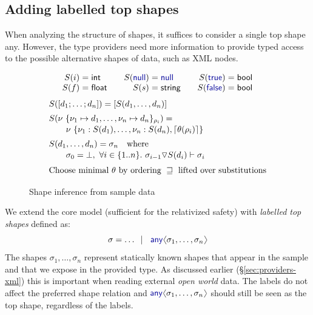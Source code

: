 \documentclass[10pt,preprint,clearpagebib]{sigplanconf}
\newcommand{\langl}{\begin{picture}(4.5,7)
\put(1.1,2.5){\rotatebox{60}{\line(1,0){5.5}}}
\put(1.1,2.5){\rotatebox{300}{\line(1,0){5.5}}}
\end{picture}}
\newcommand{\rangl}{\begin{picture}(4.5,7)
\put(.9,2.5){\rotatebox{120}{\line(1,0){5.5}}}
\put(.9,2.5){\rotatebox{240}{\line(1,0){5.5}}}
\end{picture}}
\newcommand{\kvd}[1]{\textnormal{\textcolor{kvdclr}{\sffamily #1}}}
\newcommand{\ident}[1]{\textnormal{\sffamily #1}}
\newcommand{\lsep}[0]{\;\; | \;\;}
\newcommand{\narrow}[1]{\hspace{-0.7em} #1 \hspace{-0.7em}}
\newcommand{\addopt}[1]{\lceil#1\rceil}
\newcommand{\semalt}[1]{S(#1)}
\begin{document}
\subsection{Adding labelled top shapes}
\label{sec:inference-vars}

When analyzing the structure of shapes, it suffices to consider a single top shape \kvd{any}.
However, the type providers need more information to provide typed access to the possible 
alternative shapes of data, such as XML nodes. 

\begin{figure}[!h]
\noindent
\begin{equation*}
\begin{array}{rclcrclcrcl}
 \semalt{i} &\narrow{=}& \ident{int} && \semalt{\kvd{null}}  &\narrow{=}& \kvd{null} && \semalt{\kvd{true}} &\narrow{=}& \ident{bool}\\
 \semalt{f} &\narrow{=}& \ident{float} && \semalt{s} &\narrow{=}& \ident{string} && \semalt{\kvd{false}}  &\narrow{=}& \ident{bool}\\
\end{array}
\end{equation*}
\noindent
\vspace{-0.5em}
\begin{equation*}
\begin{array}{l}
 \semalt{[d_1; \ldots; d_n]} = [\semalt{d_1, \ldots, d_n}]
 \\[0.5em]
 \semalt{\nu~\{ \nu_1 \mapsto d_1, \ldots, \nu_n \mapsto d_n \}_{\rho_i}} =\\[0.1em]
 \qquad\nu~\{ \nu_1:\semalt{d_1}, \ldots, \nu_n :\semalt{d_n}, \addopt{\theta(\rho_i)} \}
 \\[0.5em]
 \semalt{d_1, \ldots, d_n} = \sigma_n \quad\textnormal{where}\\[0.1em]
 \qquad\sigma_0 = \bot,~ \forall i\in \{ 1.. n \}.~ \sigma_{i-1} \triangledown \semalt{d_i} \vdash \sigma_i \\[0.6em]
 \textnormal{Choose minimal}\ \theta\ \textnormal{by ordering}\ \sqsupseteq\ \textnormal{lifted over substitutions} \\[0.1em]
\end{array}
\end{equation*}
\caption{Shape inference from sample data}
\label{fig:shape-inference}
\vspace{-0.5em}
\end{figure}

We extend the core model (sufficient for the relativized safety) 
with \emph{labelled top shapes} defined as:
% 
\begin{equation*}
\sigma = \ldots \lsep \kvd{any}\langl \sigma_1, \ldots, \sigma_n\rangl
\end{equation*}
%
The shapes $\sigma_1, \ldots, \sigma_n$ represent statically known shapes that appear in the
sample and that we expose in the provided type. As discussed earlier (\S\ref{sec:providers-xml})
this is important when reading external \emph{open world} data. The labels do not affect the 
preferred shape relation and $\kvd{any}\langl \sigma_1, \ldots, \sigma_n\rangl$ should still be
seen as the top shape, regardless of the labels.
\end{document}
